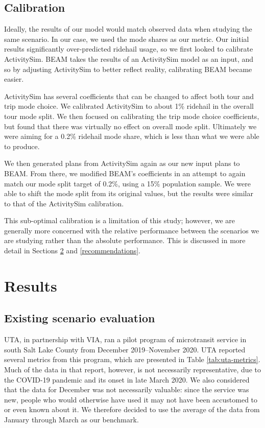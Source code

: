 \documentclass[
]{report}
\begin{document}
\hypertarget{scenario-calibration}{%
\section{Calibration}\label{scenario-calibration}}

Ideally, the results of our model would match observed data when studying the same scenario. In our case, we used the mode shares as our metric. Our initial results significantly over-predicted ridehail usage, so we first looked to calibrate ActivitySim. BEAM takes the results of an ActivitySim model as an input, and so by adjusting ActivitySim to better reflect reality, calibrating BEAM became easier.

ActivitySim has several coefficients that can be changed to affect both tour and trip mode choice. We calibrated ActivitySim to about 1\% ridehail in the overall tour mode split. We then focused on calibrating the trip mode choice coefficients, but found that there was virtually no effect on overall mode split. Ultimately we were aiming for a 0.2\% ridehail mode share, which is less than what we were able to produce.

We then generated plans from ActivitySim again as our new input plans to BEAM. From there, we modified BEAM's coefficients in an attempt to again match our mode split target of 0.2\%, using a 15\% population sample. We were able to shift the mode split from its original values, but the results were similar to that of the ActivitySim calibration.

This sub-optimal calibration is a limitation of this study; however, we are generally more concerned with the relative performance between the scenarios we are studying rather than the absolute performance. This is discussed in more detail in Sections \ref{results} and \ref{recommendations}.

\hypertarget{results}{%
\chapter{Results}\label{results}}

\hypertarget{existing-scenario-evaluation}{%
\section{Existing scenario evaluation}\label{existing-scenario-evaluation}}

UTA, in partnership with VIA, ran a pilot program of microtransit service in south Salt Lake County from December 2019--November 2020. UTA reported several metrics from this program, which are presented in Table \ref{tab:uta-metrics}. Much of the data in that report, however, is not necessarily representative, due to the COVID-19 pandemic and its onset in late March 2020. We also considered that the data for December was not necessarily valuable: since the service was new, people who would otherwise have used it may not have been accustomed to or even known about it. We therefore decided to use the average of the data from January through March as our benchmark.
\end{document}
